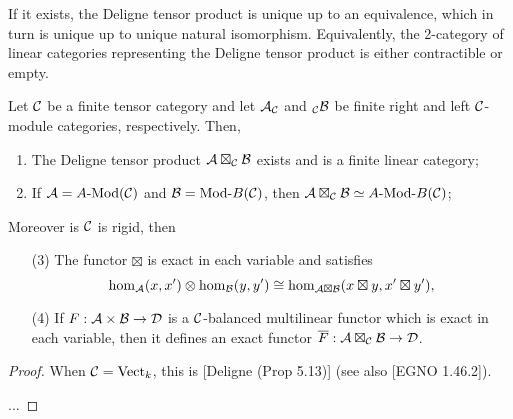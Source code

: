 \documentclass{amsart}
\begin{document}
If it exists, the Deligne tensor product is unique up to an equivalence, which in turn is unique up to unique natural isomorphism. Equivalently, the 2-category of linear categories representing the Deligne tensor product is either contractible or empty. 

\begin{theorem}
	Let $\mathcal C$ be a finite tensor category and let $\mathcal A_{\mathcal C}$ and ${}_{\mathcal C}\mathcal B$ be finite right and left $\mathcal C$-module categories, respectively. Then,
	\begin{enumerate}
		\item The Deligne tensor product $\mathcal A \boxtimes_{\mathcal C} \mathcal B$ exists and is a finite linear category;
		\item If $\cA = \Mod{A}{}(\cC)$ and $\cB = \Mod{}{B}(\cC)$, then $\cA \boxtimes_{\cC} \cB \simeq \Mod{A }{B}(\cC)$;
	\end{enumerate} 
Moreover is $\mathcal C$ is rigid, then 	
	\begin{enumerate}
		\item[(3)] The functor $\boxtimes$ is exact in each variable and satisfies 
		\begin{equation*}
			\hom_{\mathcal A}(x,x') \otimes \hom_{\mathcal B}(y, y') \cong \hom_{\mathcal A \boxtimes \mathcal B} (x \boxtimes y, x' \boxtimes y'),
		\end{equation*}
		\item[(4)] If $F: \mathcal A \times \mathcal B \to \mathcal D$ is a $\mathcal C$-balanced multilinear functor which is exact in each variable, then it defines an exact functor $\overline{F}: \mathcal A \boxtimes_{\mathcal C} \mathcal B \to \mathcal D$. 
	\end{enumerate} 
\end{theorem}

\begin{proof}
	When $\mathcal C = \mathrm{Vect}_k$, this is [Deligne (Prop 5.13)] (see also [EGNO 1.46.2]).
	
	
	
	...
\end{proof}


\end{document}

